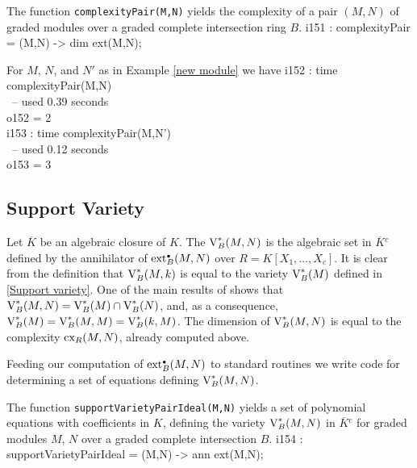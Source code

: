\begin{sCode}
The function {\tt complexityPair(M,N)} yields the complexity of a pair
$(M,N)$ of graded modules over a graded complete intersection ring $B$.
\beginOutput
i151 : complexityPair = (M,N) -> dim ext(M,N);\\
\endOutput
 \end{sCode}

\begin{sExample}
For $M$, $N$, and $N'$ as in Example \ref{new module} we have
\beginOutput
i152 : time complexityPair(M,N)\\
\     -- used 0.39 seconds\\
\emptyLine
o152 = 2\\
\endOutput
\beginOutput
i153 : time complexityPair(M,N')\\
\     -- used 0.12 seconds\\
\emptyLine
o153 = 3\\
\endOutput
\end{sExample}

\subsection{Support Variety}
\label{Support variety2}

Let $\overline K$ be an algebraic closure of $K$.  The {\it{}\/} $\operatorname{V}^*_B(M,N)$ is the algebraic set in ${\overline K}{}^c$
defined by the annihilator of $\operatorname{ext}^{\scriptscriptstyle\bullet}_B(M,N)$ over
$R=K[X_1,\dots,X_c]$.  It is clear from the definition that
$\operatorname{V}^*_B(M,k)$ is equal to the variety $\operatorname{V}^*_B(M)$ defined in
\ref{Support variety}.  One of the main results of
\cite[Sect.~5]{CI:AB2} shows that $\operatorname{V}^*_B(M,N)=\operatorname{V}^*_B(M)\cap
\operatorname{V}^*_B(N)$, and, as a consequence, $\operatorname{V}^*_B(M)=\operatorname{V}^*_B(M,M)=
\operatorname{V}^*_B(k,M)$.  The dimension of $\operatorname{V}^*_B(M,N)$ is equal to the
complexity $\operatorname{cx}_R(M,N)$, already computed above.

Feeding our computation of $\operatorname{ext}^{\scriptscriptstyle\bullet}_B(M,N)$ to standard \Mtwo
routines we write code for determining a set of equations defining
$\operatorname{V}^*_B(M,N)$.

\begin{sCode}
The function {\tt supportVarietyPairIdeal(M,N)} yields a set of polynomial
equations with coefficients in $K$, defining the variety
$\operatorname{V}^*_B(M,N)$ in ${\overline K}{}^c$ for graded modules $M$, $N$ over
a graded complete intersection $B$.
\beginOutput
i154 : supportVarietyPairIdeal = (M,N) -> ann ext(M,N);\\
\endOutput
 \end{sCode}

